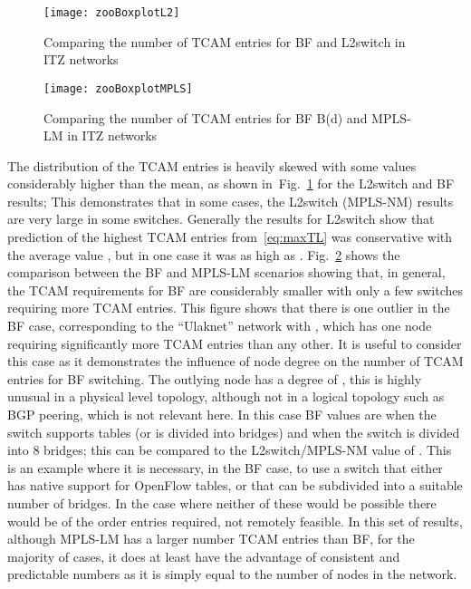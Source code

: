 \documentclass[conference]{IEEEtran}
\newcommand{\figref}[1]{Fig.~\ref{#1}}
\begin{document}
\begin{figure}[tb]
  \centering
\texttt{[image: zooBoxplotL2]}
  \caption{Comparing the number of  TCAM entries for BF  and L2switch
    in ITZ networks}
  \label{fig:zooBoxPlotL2}
\end{figure}
\begin{figure}[tb]
  \centering
\texttt{[image: zooBoxplotMPLS]}
  \caption{Comparing the number of  TCAM entries for BF B(d) and MPLS-LM
    in ITZ networks}
  \label{fig:zooBoxPlotMPLS}
\end{figure}
The distribution of the TCAM entries is heavily skewed with some values considerably higher than the mean, as shown in~\figref{fig:zooBoxPlotL2} for the L2switch and BF results; This demonstrates that in some cases, the L2switch (MPLS-NM) results are very large in some switches. Generally the results for L2switch show that prediction of the highest TCAM entries  from~\eqref{eq:maxTL} was conservative with the average value , but in one case it was as high as .  \figref{fig:zooBoxPlotMPLS} shows the comparison between the BF and MPLS-LM scenarios showing that, in general, the TCAM requirements for BF are considerably smaller with only a few switches requiring more TCAM entries. This figure shows that there is one outlier in the BF case, corresponding to the  ``Ulaknet'' network with , which has one node requiring significantly more TCAM entries than any other. It is useful to consider this case as it demonstrates the influence of node degree on the number of TCAM entries for BF switching. The outlying node has a degree of , this is highly unusual in a physical level topology, although not in a logical topology such as BGP peering, which is not relevant here. In this case BF values are  when the switch supports tables (or is divided into  bridges) and  when the switch is divided into 8 bridges; this can be compared to the L2switch/MPLS-NM value of  . This is an example where it is necessary, in the BF case, to use a switch that either has native support for OpenFlow tables, or that can be subdivided into a suitable number of bridges. In the case where neither of these would be possible there would be of the order  entries required, not remotely feasible. In this set of results, although MPLS-LM has a larger number TCAM entries than BF, for the majority of cases, it does at least have the advantage of consistent and predictable numbers as it is simply equal to the number of nodes in the network.
\end{document}

